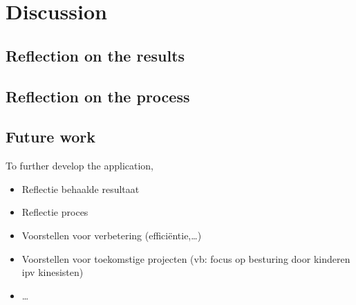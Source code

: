\chapter{Discussion}




\section{Reflection on the results}




\section{Reflection on the process}




\section{Future work}

To further develop the application, 


\begin{itemize}
\item Reflectie behaalde resultaat
\item Reflectie proces
\item Voorstellen voor verbetering (effici\"entie,\ldots)
\item Voorstellen voor toekomstige projecten (vb: focus op besturing door kinderen ipv kinesisten)
\item \ldots
\end{itemize}